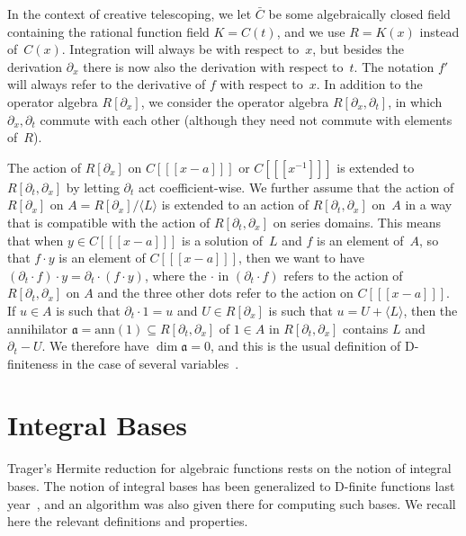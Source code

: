 \documentclass{sig-alternate}
\def\<#1>{\langle#1\rangle}
\begin{document}
In the context of creative telescoping, we let $\bar C$ be some algebraically
closed field containing the rational function field $K=C(t)$, and we
use $R=K(x)$ instead of~$C(x)$. Integration will always be with respect to~$x$, but
besides the derivation $\partial_x$ there is now also the derivation with respect
to~$t$. The notation $f'$ will always refer to the derivative of $f$
with respect to~$x$. In addition to the operator algebra $R[\partial_x]$, we consider the
operator algebra $R[\partial_x,\partial_t]$, in which $\partial_x,\partial_t$
commute with each other (although they need not commute with elements of~$R$).

The action of $R[\partial_x]$ on $C[[[x-a]]]$ or $C[[[x^{-1}]]]$ is extended
to $R[\partial_t,\partial_x]$ by letting $\partial_t$ act coefficient-wise.
We further assume that the action of $R[\partial_x]$ on $A=R[\partial_x]/\<L>$ is
extended to an action of $R[\partial_t,\partial_x]$ on~$A$ in a way that is
compatible with the action of $R[\partial_t,\partial_x]$ on series domains.
This means that when $y\in C[[[x-a]]]$ is a solution of~$L$ and $f$ is an
element of~$A$, so that $f\cdot y$ is an element of $C[[[x-a]]]$, then we
want to have $(\partial_t\cdot f)\cdot y=\partial_t\cdot(f\cdot y)$, where
the $\cdot$ in $(\partial_t\cdot f)$ refers to the action of $R[\partial_t,\partial_x]$
on $A$ and the three other dots refer to the action on $C[[[x-a]]]$. 
If $u\in A$ is such that $\partial_t\cdot 1 = u$ and $U\in R[\partial_x]$ is such
that $u=U+\<L>$, then the annihilator $\mathfrak{a}=\mathrm{ann}(1)\subseteq R[\partial_t,\partial_x]$
of $1\in A$ in $R[\partial_t,\partial_x]$ contains $L$ and $\partial_t-U$. We
therefore have $\dim\mathfrak{a}=0$, and this is the usual
definition of D-finiteness in the case of several variables~\cite{Zeilberger1990,chyzak98,koutschan09,kauers14c}.

\section{Integral Bases}

Trager's Hermite reduction for algebraic functions rests on the notion of
integral bases. The notion of integral bases has been generalized to D-finite
functions last year~\cite{kauers15b}, and an algorithm was also given there for
computing such bases. We recall here the relevant definitions and properties.
\end{document}
